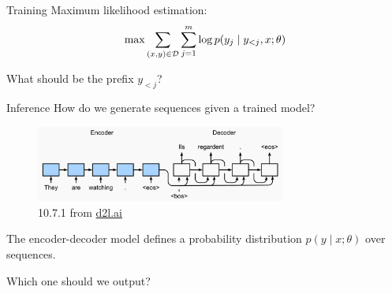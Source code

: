 \documentclass[usenames,dvipsnames,notes,11pt,aspectratio=169,hyperref={colorlinks=true, linkcolor=blue}]{beamer}
\begin{document}
\begin{frame}
    {Training}
    Maximum likelihood estimation:\\
    $$
    \max \sum_{(x,y)\in\mathcal{D}} \sum_{j=1}^m \log p(y_j\mid y_{<j}, x; \theta)
    $$
    \pause

    What should be the prefix $y_{<j}$?\\[1ex]\pause
\end{frame}

\begin{frame}
    {Inference}
    How do we generate sequences given a trained model?
    \begin{figure}
        \includegraphics[height=2.5cm]{figures/rnn-enc-dec-gen}
        \caption{10.7.1 from \href{https://d2l.ai/chapter_recurrent-modern/seq2seq.html}{d2l.ai}}
    \end{figure}

    The encoder-decoder model defines a probability distribution $p(y\mid x;\theta)$ over sequences.

    Which one should we output?
\end{frame}
\end{document}
